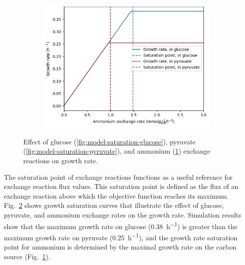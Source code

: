 \begin{figure}
  \begin{subfigure}[t]{0.45\textwidth}
  \centering
    \includegraphics[width=\linewidth]{saturation_amm}
    \caption{
    }
    \label{fig:model-saturation-ammonium}
  \end{subfigure}

  \caption{
    Effect of glucose (\ref{fig:model-saturation-glucose}), pyruvate (\ref{fig:model-saturation-pyruvate}), and ammonium (\ref{fig:model-saturation-ammonium}) exchange reactions on growth rate.
  }
  \label{fig:model-saturation}
\end{figure}

The saturation point of exchange reactions functions as a useful reference for exchange reaction flux values.
This saturation point is defined as the flux of an exchange reaction above which the objective function reaches its maximum.
Fig.\ \ref{fig:model-saturation} shows growth saturation curves that illustrate the effect of glucose, pyruvate, and ammonium exchange rates on the growth rate.
Simulation results show that the maximum growth rate on glucose (\SI{0.38}{\hour^{-1}}) is greater than the maximum growth rate on pyruvate (\SI{0.25}{\hour^{-1}}), and
the growth rate saturation point for ammonium is determined by the maximal growth rate on the carbon source (Fig.\ \ref{fig:model-saturation-ammonium}).

